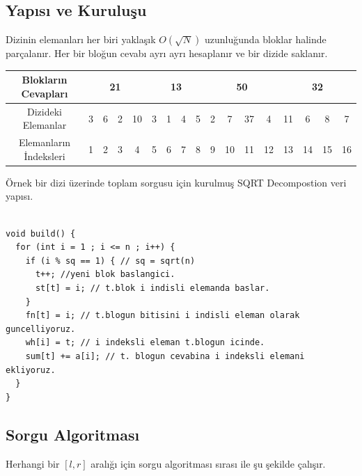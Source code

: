 \documentclass[12pt]{article}
\begin{document}
	\subsection{Yap{\i}s{\i} ve Kurulu\c{s}u}
	
	Dizinin elemanlar{\i} her biri yakla\c{s}{\i}k $O(\sqrt{N})$ uzunlu\u{g}unda bloklar halinde par\c{c}alan{\i}r. Her bir blo\u{g}un cevab{\i} ayr{\i} ayr{\i} hesaplan{\i}r ve bir dizide saklan{\i}r.
	
    \begin{table}[h]
    \centering
    \begin{tabular}{|c|c|c|c|c|c|c|c|c|c|c|c|c|c|c|c|c|}
    \hline
    Bloklar{\i}n Cevaplar{\i}   & \multicolumn{4}{c|}{21} & \multicolumn{4}{c|}{13} & \multicolumn{4}{c|}{50} & \multicolumn{4}{c|}{32} \\ \hline
    Dizideki Elemanlar     & 3    & 6   & 2   & 10   & 3    & 1    & 4   & 5   & 2   & 7    & 37   & 4   & 11   & 6    & 8   & 7   \\ \hline
    Elemanlar{\i}n \.{I}ndeksleri & 1    & 2   & 3   & 4    & 5    & 6    & 7   & 8   & 9   & 10   & 11   & 12  & 13   & 14   & 15  & 16  \\ \hline
    \end{tabular}
    \end{table}
    
	\"{O}rnek bir dizi \"{u}zerinde toplam sorgusu i\c{c}in kurulmu\c{s} SQRT Decompostion veri yap{\i}s{\i}.
	
    \begin{verbatim}

void build() {
  for (int i = 1 ; i <= n ; i++) {
    if (i % sq == 1) { // sq = sqrt(n)
      t++; //yeni blok baslangici.
      st[t] = i; // t.blok i indisli elemanda baslar.
    }
    fn[t] = i; // t.blogun bitisini i indisli eleman olarak guncelliyoruz.
    wh[i] = t; // i indeksli eleman t.blogun icinde.
    sum[t] += a[i]; // t. blogun cevabina i indeksli elemani ekliyoruz.
  }
}

    \end{verbatim}
    
    \newpage

	\subsection{Sorgu Algoritmas{\i}}
	
	Herhangi bir $[l,r]$ aral{\i}\u{g}{\i} i\c{c}in sorgu algoritmas{\i} s{\i}ras{\i} ile \c{s}u \c{s}ekilde \c{c}al{\i}\c{s}{\i}r.
	
\end{document}
